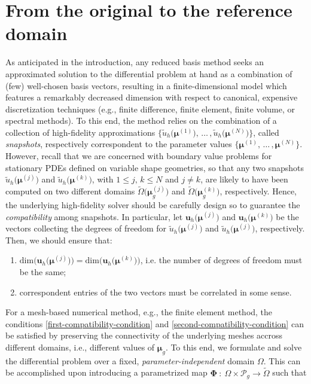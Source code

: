 \documentclass[12pt, a4paper, twoside, openright]{report}
\numberwithin{equation}{chapter}
\theoremstyle{theorem}
\theoremstyle{definition}
\theoremstyle{remark}
\theoremstyle{proposition}
\numberwithin{figure}{chapter}
\newcommand{\wt}[1]{\widetilde{#1}}
\newcommand{\bg}[1]{\boldsymbol{#1}}
\begin{document}
	\section{From the original to the reference domain}
	\label{section:From the original to the reference domain}
		
		As anticipated in the introduction, any reduced basis method seeks an approximated solution to the differential problem at hand as a combination of (few) well-chosen basis vectors, resulting in a finite-dimensional model which features a remarkably decreased dimension with respect to canonical, expensive discretization techniques (e.g., finite difference, finite element, finite volume, or spectral methods). To this end, the method relies on the combination of a collection of high-fidelity approximations $\big\lbrace \wt{u}_h \big( \bg{\mu}^{(1)} \big), \, \ldots \, , \wt{u}_h \big( \bg{\mu}^{(N)} \big) \big\rbrace$, called \emph{snapshots}, respectively correspondent to the parameter values $\big\lbrace \bg{\mu}^{(1)}, \, \ldots \, , \bg{\mu}^{(N)} \big\rbrace$. However, recall that we are concerned with boundary value problems for stationary PDEs defined on variable shape geometries, so that any two snapshots $\wt{u}_h \big( \bg{\mu}^{(j)} \big)$ and $\wt{u}_h \big( \bg{\mu}^{(k)} \big)$, with $1 \leq j, \, k \leq N$ and $j \neq k$, are likely to have been computed on two different domains $\wt{\Omega}\big( \bg{\mu}_g^{(j)}\big)$ and $\wt{\Omega}\big( \bg{\mu}_g^{(k)}\big)$, respectively. Hence, the underlying high-fidelity solver should be carefully design so to guarantee the \emph{compatibility} among snapshots. In particular, let $\mathbf{u}_h\big( \bg{\mu}^{(j)} \big)$ and $\mathbf{u}_h\big( \bg{\mu}^{(k)} \big) $ be the vectors collecting the degrees of freedom for $\wt{u}_h \big( \bg{\mu}^{(j)} \big)$ and $\wt{u}_h \big( \bg{\mu}^{(j)} \big)$, respectively. Then, we should ensure that:		
		\begin{enumerate}[label=(\alph*)]
			\item $\text{dim} \big( \mathbf{u}_h \big( \bg{\mu}^{(j)} \big) \big) = \text{dim} \big( \mathbf{u}_h \big( \bg{\mu}^{(k)} \big) \big)$, i.e. the number of degrees of freedom must be the same;
			\label{first-compatibility-condition}
			\item correspondent entries of the two vectors must be correlated in some sense.
			\label{second-compatibility-condition}
		\end{enumerate}	
		For a mesh-based numerical method, e.g., the finite element method, the conditions \ref{first-compatibility-condition} and \ref{second-compatibility-condition} can be satisfied by preserving the connectivity of the underlying meshes accross different domains, i.e., different values of $\bg{\mu}_g$. To this end, we formulate and solve the differential problem over a fixed, \emph{parameter-independent} domain $\Omega$. This can be accomplished upon introducing a parametrized map $\bg{\Phi} ~ : ~ \Omega \times \mathcal{P}_g \rightarrow \wt{\Omega}$ such that
\end{document}
